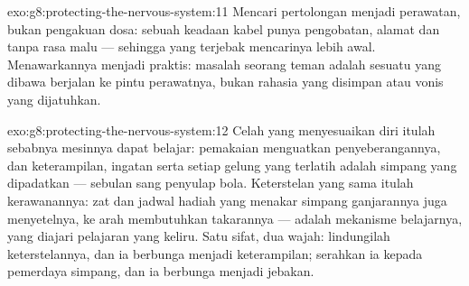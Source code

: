 \begin{solution}{exo:g8:protecting-the-nervous-system:11}
Mencari pertolongan menjadi perawatan, bukan pengakuan
dosa: sebuah keadaan kabel punya pengobatan, alamat dan
tanpa rasa malu --- sehingga yang terjebak mencarinya lebih
awal. Menawarkannya menjadi praktis: masalah seorang teman
adalah sesuatu yang dibawa berjalan ke pintu perawatnya,
bukan rahasia yang disimpan atau vonis yang dijatuhkan.
\end{solution}

\begin{solution}{exo:g8:protecting-the-nervous-system:12}
Celah yang menyesuaikan diri itulah sebabnya mesinnya dapat
belajar: pemakaian menguatkan penyeberangannya, dan
keterampilan, ingatan serta setiap gelung yang terlatih
adalah simpang yang dipadatkan --- sebulan sang penyulap
bola. Keterstelan yang sama itulah kerawanannya: zat dan
jadwal hadiah yang menakar simpang ganjarannya juga
menyetelnya, ke arah membutuhkan takarannya --- 
adalah mekanisme belajarnya, yang diajari pelajaran yang
keliru. Satu sifat, dua wajah: lindungilah keterstelannya,
dan ia berbunga menjadi keterampilan; serahkan ia kepada
pemerdaya simpang, dan ia berbunga menjadi jebakan.
\end{solution}

